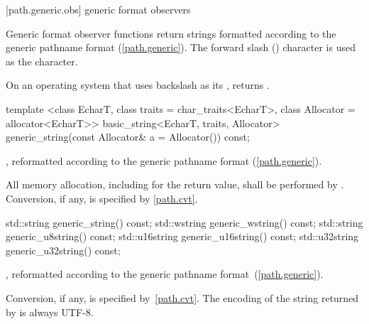 [path.generic.obs]{ generic format observers}

\pnum
Generic format observer functions return strings formatted according to the
generic pathname format (\ref{path.generic}).
The forward slash () character is used as
the  character.

\pnum
\begin{example} On an operating system that uses backslash as
its , 
returns . \end{example}

\begin{itemdecl}
template <class EcharT, class traits = char_traits<EcharT>,
          class Allocator = allocator<EcharT>>
  basic_string<EcharT, traits, Allocator>
    generic_string(const Allocator& a = Allocator()) const;
\end{itemdecl}

\begin{itemdescr}
\pnum
\returns {}, reformatted according to the generic
pathname format (\ref{path.generic}).

\pnum
\remarks All memory allocation, including for the return value, shall
be performed by . Conversion, if any, is specified by
\ref{path.cvt}.
\end{itemdescr}

\begin{itemdecl}
std::string generic_string() const;
std::wstring generic_wstring() const;
std::string generic_u8string() const;
std::u16string generic_u16string() const;
std::u32string generic_u32string() const;
\end{itemdecl}

\begin{itemdescr}
\pnum
\returns {}, reformatted according to the generic
pathname format~(\ref{path.generic}).

\pnum
\remarks Conversion, if any, is specified by~\ref{path.cvt}.
The encoding of the string returned by  is always
UTF-8.
\end{itemdescr}

